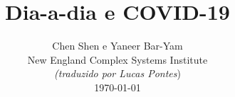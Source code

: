 \documentclass[onecolumn,journal]{IEEEtran}
\begin{document}
\title{\color{Brown}  Dia-a-dia e COVID-19
\vspace{-0.35ex}}
\author{Chen Shen e Yaneer Bar-Yam \\ New England Complex Systems Institute \\
\vspace{+0.35ex}
\small{\textit{(traduzido por Lucas Pontes})}\\
 \today
  \vspace{-8ex} \\
\textbf{}
 }

\maketitle




\thispagestyle{empty} %





\end{document}
